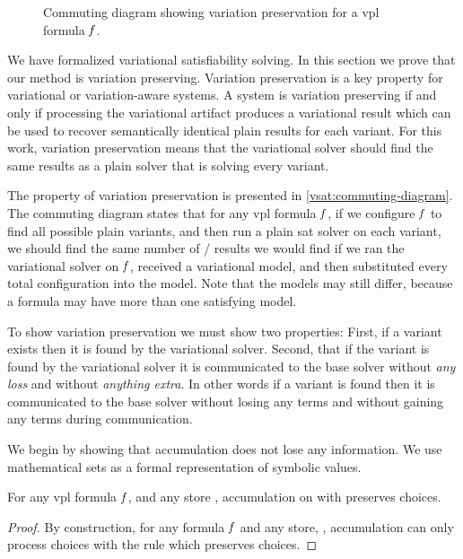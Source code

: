 \label{section:vsat:variation-preservation}
%
\begin{figure}[h]
  \centering
  
  \caption{Commuting diagram showing variation preservation for a \ac{vpl}
    formula $\mathit{f}$.}%
  \label{vsat:commuting-diagram}
\end{figure}
%
We have formalized variational satisfiability solving. In this section we prove
that our method is variation preserving. Variation preservation is a key
property for variational or variation-aware systems. A system is variation
preserving if and only if processing the variational artifact produces a
variational result which can be used to recover semantically identical plain
results for each variant. For this work, variation preservation means that the
variational solver should find the same results as a plain solver that is
solving every variant.

The property of variation preservation is presented in
\autoref{vsat:commuting-diagram}. The commuting diagram states that for any
\ac{vpl} formula $\mathit{f}$, if we configure $\mathit{f}$ to find all possible plain
variants, and then run a plain \ac{sat} solver on each variant, we should find
the same number of / results we would find if we ran the
variational solver on $\mathit{f}$, received a variational model, and then
substituted every total configuration into the model. Note that the models may
still differ, because a formula may have more than one satisfying model.

To show variation preservation we must show two properties: First, if a variant
exists then it is found by the variational solver. Second, that if the variant
is found by the variational solver it is communicated to the base solver without
\emph{any loss} and without \emph{anything extra}. In other words if a variant
is found then it is communicated to the base solver without losing any terms and
without gaining any terms during communication.

We begin by showing that accumulation does not lose any information. We use
mathematical sets as a formal representation of symbolic values.

\begin{lemma}
  For any \ac{vpl} formula $\mathit{f}$, and any store \aStore{}, accumulation on
  \fV{} with \aStore{} preserves choices.
\end{lemma}
%
\begin{proof}
  By construction, for any formula $\mathit{f}$ and any store, \aStore{},
  accumulation can only process choices with the \acChc{} rule which preserves
  choices.
\end{proof}

